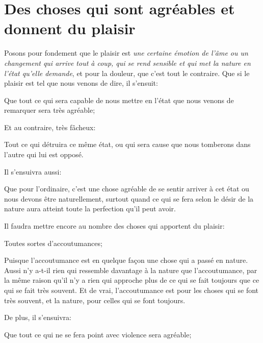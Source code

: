 
\section{Des choses qui sont agréables et donnent du plaisir}

Posons pour fondement que le plaisir est \emph{une certaine émotion de l’âme  ou un changement qui arrive
tout à coup, qui se rend sensible et qui met la nature en l'état qu'elle demande}, et pour la douleur, que
c'est tout le contraire. Que si le plaisir est tel que nous venons de dire, il s'ensuit:

\begin{lieu}
	Que tout ce qui sera capable de nous mettre en l'état que nous venons de remarquer sera très agréable;
\end{lieu}

Et au contraire, très fâcheux:

\begin{lieu}
	Tout ce qui détruira ce même état, ou qui sera cause que nous tomberons dans l'autre qui lui est opposé.
\end{lieu}

\bigbreak

Il s'ensuivra aussi:

\begin{lieu}
	Que pour l'ordinaire, c'est une chose agréable de se sentir arriver à cet état ou nous devons être
	naturellement, surtout quand ce qui se fera selon le désir de la nature aura atteint toute la perfection
	qu'il peut avoir. 
\end{lieu}

\bigbreak

Il faudra mettre encore au nombre des choses qui apportent du plaisir:

\begin{lieu}
	Toutes sortes d'accoutumances;
\end{lieu}

Puisque l'accoutumance est en quelque façon une chose qui a passé en nature. Aussi n'y a-t-il rien qui
ressemble davantage à la nature que l'accoutumance, par la même raison qu'il n'y a rien qui approche plus
de ce qui se fait toujours que ce qui se fait très souvent. Et de vrai, l'accoutumance est pour les choses
qui se font très souvent, et la nature, pour celles qui se font toujours.

\bigbreak

De plus, il s'ensuivra:

\begin{lieu}
	Que tout ce qui ne se fera point avec violence sera agréable;
\end{lieu}

